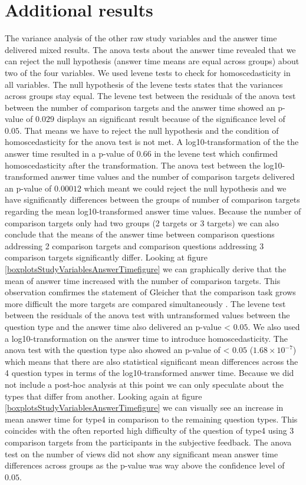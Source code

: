\section{Additional results}
The variance analysis of the other raw study variables and the answer time delivered mixed results. The anova tests
about the answer time revealed that we can reject the null hypothesis (answer time means are equal across groups) about two of the four variables.
We used levene tests to check for homoscedasticity in all variables. The null hypothesis of the levene tests states that the variances across groups stay equal.
The levene test between the residuals of the anova test between the number of comparison targets and the answer time showed an p-value of $0.029$ displays an significant result
because of the significance level of $0.05$. That means we have to reject the null hypothesis and the condition of homoscedasticity for the anova test is not met.
A log10-transformation of the the answer time resulted in a p-value of $0.66$ in the levene test which confirmed homoscedasticity after the transformation.
The anova test between the log10-transformed answer time values and the number of comparison targets delivered an p-value of $0.00012$ which meant we could reject the
null hypothesis and we have significantly differences between the groups of number of comparison targets regarding the mean log10-transformed answer time values.
Because the number of comparison targets only had two groups (2 targets or 3 targets) we can also conclude that the means of the answer time between comparison
questions addressing 2 comparison targets and comparison questions addressing 3 comparison targets significantly differ. Looking at figure \ref{boxplotsStudyVariablesAnswerTimefigure}
we can graphically derive that the mean of answer time increased with the number of comparison targets. This observation comfirmes the statement of Gleicher that
the comparison task grows more difficult the more targets are compared simultaneously \citep*{Gleicher.2018}. 
The levene test between the residuals of the anova test with untransformed values between the question type and the answer time also delivered an p-value < $0.05$.
We also used a log10-transformation on the answer time to introduce homoscedasticity. The anova test with the question type also showed an p-value of
< $0.05$ ($1.68 \times 10^{-7}$) which means that there are also statistical significant mean differences across the 4 question types in terms of the
log10-transformed answer time. Because we did not include a post-hoc analysis at this point we can only speculate about the types that differ from another. Looking
again at figure \ref{boxplotsStudyVariablesAnswerTimefigure} we can visually see an increase in mean answer time for type4 in comparison to the remaining question types.
This coincides with the often reported high difficulty of the question of type4 using 3 comparison targets from the participants in the subjective feedback.
The anova test on the number of views did not show any significant mean answer time differences across groups as the p-value was way above
the confidence level of $0.05$.

